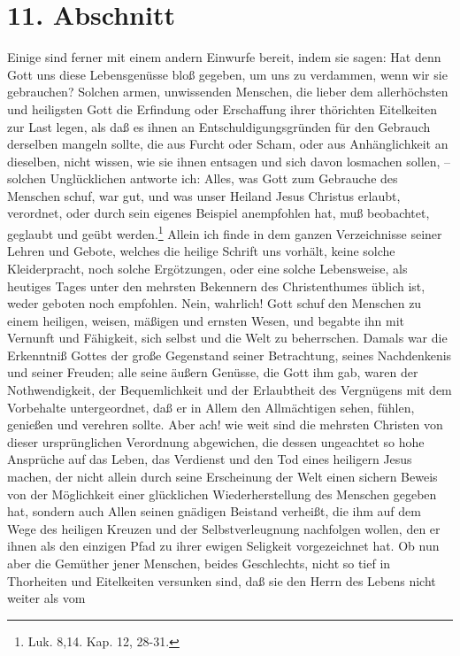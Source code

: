 \section{11. Abschnitt} \label{kap17_ab11}

Einige sind ferner mit einem andern Einwurfe bereit, indem sie sagen: Hat denn
Gott uns diese Lebensgenüsse bloß gegeben, um uns zu verdammen, wenn wir sie
gebrauchen? Solchen armen, unwissenden Menschen, die lieber dem allerhöchsten
und heiligsten Gott die Erfindung oder Erschaffung ihrer thörichten Eitelkeiten
zur Last legen, als daß es ihnen an Entschuldigungsgründen für den Gebrauch
derselben mangeln sollte, die aus Furcht oder Scham, oder aus Anhänglichkeit an
dieselben, nicht wissen, wie sie ihnen entsagen und sich davon losmachen sollen,
-- solchen Unglücklichen antworte ich: Alles, was Gott zum Gebrauche des
Menschen schuf, war gut, und was unser Heiland Jesus Christus erlaubt,
verordnet, oder durch sein eigenes Beispiel anempfohlen hat, muß beobachtet,
geglaubt und geübt werden.\footnote{Luk. 8,14. Kap. 12, 28-31.}  Allein ich
finde in dem ganzen Verzeichnisse seiner Lehren und Gebote, welches die heilige
Schrift uns vorhält, keine solche Kleiderpracht, noch solche Ergötzungen, oder
eine solche Lebensweise, als heutiges Tages unter den mehrsten Bekennern des
Christenthumes üblich ist, weder geboten noch empfohlen. Nein, wahrlich! Gott
schuf den Menschen zu einem heiligen, weisen, mäßigen und ernsten Wesen, und
begabte ihn mit Vernunft und Fähigkeit, sich selbst und die Welt zu beherrschen.
Damals war die Erkenntniß Gottes der große Gegenstand seiner Betrachtung, seines
Nachdenkenis und seiner Freuden; alle seine äußern Genüsse, die Gott ihm gab,
waren der Nothwendigkeit, der Bequemlichkeit und der Erlaubtheit des Vergnügens
mit dem Vorbehalte untergeordnet, daß er in Allem den Allmächtigen sehen,
fühlen, genießen und verehren sollte. Aber ach! wie weit sind die mehrsten
Christen von dieser ursprünglichen Verordnung abgewichen, die dessen ungeachtet
so hohe Ansprüche auf das Leben, das Verdienst und den Tod eines heiligern Jesus
machen, der nicht allein durch seine Erscheinung der Welt einen sichern Beweis
von der Möglichkeit einer glücklichen Wiederherstellung des Menschen gegeben
hat, sondern auch Allen seinen gnädigen Beistand verheißt, die ihm auf dem Wege
des heiligen Kreuzen und der Selbstverleugnung nachfolgen wollen, den er ihnen
als den einzigen Pfad zu ihrer ewigen Seligkeit vorgezeichnet hat. Ob nun aber
die Gemüther jener Menschen, beides Geschlechts, nicht so tief in Thorheiten und
Eitelkeiten versunken sind, daß sie den Herrn des Lebens nicht weiter als vom
